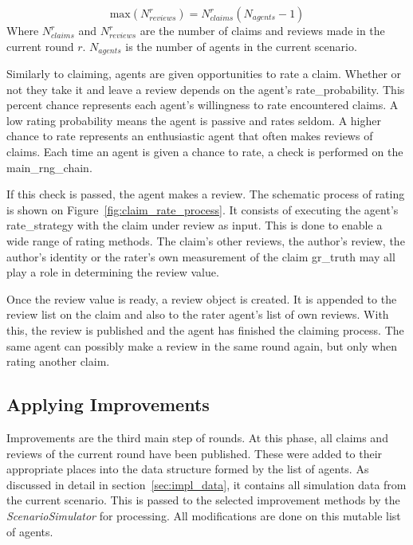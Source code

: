 \documentclass[%
    ]{\PathToTumTemplate/thesis/tum_thesis}
\begin{document}
\begin{equation}\label{eq:max_reviews}
	\mathrm{max}(N^r_{reviews}) = N^r_{claims} (N_{agents}-1)
\end{equation}
Where $ N^r_{claims} $ and $ N^r_{reviews} $ are the number of claims and reviews made in the current round $r$.
$ N_{agents} $ is the number of agents in the current scenario.

Similarly to claiming, agents are given opportunities to rate a claim.
Whether or not they take it and leave a review depends on the agent's \gls{rate_probability}.
This percent chance represents each agent's willingness to rate encountered claims.
A low rating probability means the agent is passive and rates seldom.
A higher chance to rate represents an enthusiastic agent that often makes reviews of claims.
Each time an agent is given a chance to rate, a check is performed on the \gls{main_rng_chain}.

If this check is passed, the agent makes a review.
The schematic process of rating is shown on Figure~\ref{fig:claim_rate_process}.
It consists of executing the agent's \gls{rate_strategy} with the claim under review as input.
This is done to enable a wide range of rating methods.
The claim's other reviews, the author's review, the author's identity or the rater's own measurement of the claim \gls{gr_truth} may all play a role in determining the review value.

Once the review value is ready, a review object is created.
It is appended to the review list on the claim and also to the rater agent's list of own reviews.
With this, the review is published and the agent has finished the claiming process.
The same agent can possibly make a review in the same round again, but only when rating another claim.


\subsection{Applying Improvements}

Improvements are the third main step of rounds.
At this phase, all claims and reviews of the current round have been published.
These were added to their appropriate places into the data structure formed by the list of agents.
As discussed in detail in section~\ref{sec:impl_data}, it contains all simulation data from the current scenario.
This is passed to the selected improvement methods by the \emph{ScenarioSimulator} for processing.
All modifications are done on this mutable list of agents.
\end{document}
